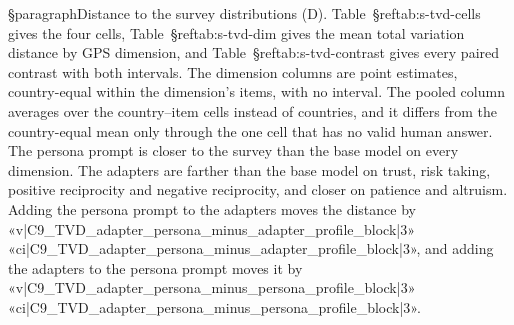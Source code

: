 §paragraph{Distance to the survey distributions (D).} Table~§ref{tab:s-tvd-cells} gives the four cells, Table~§ref{tab:s-tvd-dim} gives the mean total variation distance by GPS dimension, and Table~§ref{tab:s-tvd-contrast} gives every paired contrast with both intervals. The dimension columns are point estimates, country-equal within the dimension's items, with no interval. The pooled column averages over the country--item cells instead of countries, and it differs from the country-equal mean only through the one cell that has no valid human answer. The persona prompt is closer to the survey than the base model on every dimension. The adapters are farther than the base model on trust, risk taking, positive reciprocity and negative reciprocity, and closer on patience and altruism. Adding the persona prompt to the adapters moves the distance by «v|C9_TVD_adapter_persona_minus_adapter_profile_block|3» «ci|C9_TVD_adapter_persona_minus_adapter_profile_block|3», and adding the adapters to the persona prompt moves it by «v|C9_TVD_adapter_persona_minus_persona_profile_block|3» «ci|C9_TVD_adapter_persona_minus_persona_profile_block|3».


